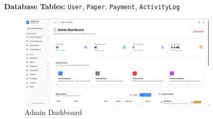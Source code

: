 \textbf{Database Tables:} \texttt{User}, \texttt{Paper}, \texttt{Payment}, \texttt{ActivityLog}

\begin{figure}[H]
\centering
\includegraphics[width=0.85\textwidth]{images/screenshots/admin_overview.png}
\caption{Admin Dashboard}
\label{fig:admin}
\end{figure}
